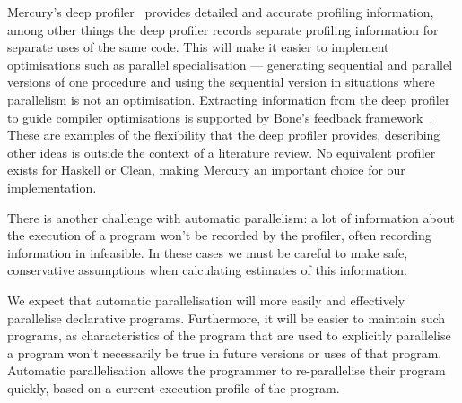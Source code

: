Mercury's deep profiler~\cite{conway:2001:mercury-deep} provides
detailed and accurate profiling information,
among other things the deep profiler records separate profiling
information for separate uses of the same code.
This will make it easier to implement optimisations such as
parallel specialisation --- generating sequential and parallel
versions of one procedure and using the sequential version
in situations where parallelism is not an optimisation.
Extracting information from the deep profiler to guide compiler
optimisations is supported by Bone's feedback
framework~\cite{bone:2008:hons}.
These are examples of the flexibility that the deep profiler provides,
describing other ideas is outside the context of a literature review.
No equivalent profiler exists for Haskell or Clean, making Mercury an
important choice for our implementation.

There is another challenge with automatic parallelism: a lot of
information about the execution of a program won't be recorded by the
profiler, often recording information in infeasible.
In these cases we must be careful to make safe, conservative
assumptions when calculating estimates of this information.



We expect that automatic parallelisation will more easily and
effectively parallelise declarative programs.
Furthermore, it will be easier to maintain such programs, as
characteristics of the program that are used to explicitly parallelise
a program won't necessarily be true in future versions or uses of that
program.
Automatic parallelisation allows the programmer to re-parallelise
their program quickly, based on a current execution profile of the
program.

